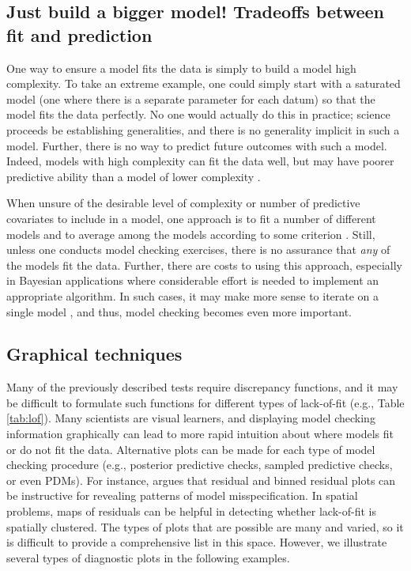 \documentclass[12pt,english]{article}
\begin{document}
\begin{spacing}{1.9}
\subsection{Just build a bigger model!  Tradeoffs between fit and
  prediction}

One way to ensure a model fits the data is simply to build a model
high complexity.  To take an extreme example, one could simply start
with a saturated model (one where there is a separate parameter for
each datum) so that the model fits the data perfectly.  No one would
actually do this in practice; science proceeds be establishing
generalities, and there is no generality implicit in such a model.
Further, there is no way to predict future outcomes with such a model.
Indeed, models with high complexity can fit the data well, but may
have poorer predictive ability than a model of lower complexity
\citep{BurnhamAnderson2002,HootenHobbs2015}.

When unsure of the desirable level of complexity or number of
predictive covariates to include in a model, one approach is to fit a
number of different models and to average among the models according
to some criterion \citep[see,
e.g.,][]{Green1995,HoetingEtAl1999,LinkBarker2006}. Still, unless one
conducts model checking exercises, there is no assurance that
\textit{any} of the models fit the data.  Further, there are costs to
using this approach, especially in Bayesian applications where
considerable effort is needed to implement an appropriate algorithm.
In such cases, it may make more sense to iterate on a single model
\citep{VerHoefBoveng2015}, and thus, model checking becomes even more
important.

\subsection{Graphical techniques}

Many of the previously described tests require discrepancy functions,
and it may be difficult to formulate such functions for different
types of lack-of-fit (e.g., Table \ref{tab:lof}).  Many scientists are
visual learners, and displaying model checking information graphically
can lead to more rapid intuition about where models fit or do not fit
the data.  Alternative plots can be made for each type of model
checking procedure (e.g., posterior predictive checks, sampled
predictive checks, or even PDMs).  For instance,
\citet{GelmanEtAl2014} argues that residual and binned residual plots
can be instructive for revealing patterns of model misspecification.
In spatial problems, maps of residuals can be helpful in detecting
whether lack-of-fit is spatially clustered.  The types of plots that
are possible are many and varied, so it is difficult to provide a
comprehensive list in this space. However, we illustrate several types
of diagnostic plots in the following examples.


\end{spacing}
\end{document}
